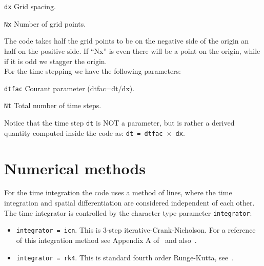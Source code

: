 \documentclass[12pt]{article}
\begin{document}
\begin{list}{}{
\setlength{\leftmargin}{25mm}
\setlength{\labelsep}{10mm}
\setlength{\labelwidth}{15mm}}

\item[\texttt{dx}] Grid spacing.

\item[\texttt{Nx}] Number of grid points.

\end{list}

The code takes half the grid points to be on the negative side of the
origin an half on the positive side.  If ``Nx'' is even there will be a
point on the origin, while if it is odd we stagger the origin. \\

For the time stepping we have the following parameters:

\begin{list}{}{
\setlength{\leftmargin}{25mm}
\setlength{\labelsep}{10mm}
\setlength{\labelwidth}{15mm}}

\item[\texttt{dtfac}] Courant parameter (dtfac=dt/dx).

\item[\texttt{Nt}] Total number of time steps.

\end{list}

Notice that the time step \texttt{dt} is NOT a parameter, but is
rather a derived quantity computed inside the code as: \texttt{dt =
dtfac $\times$ dx}.



\setcounter{equation}{0}
\section{Numerical methods}
\label{sec:numerics}

For the time integration the code uses a method of lines, where the
time integration and spatial differentiation are considered
independent of each other. \\

The time integrator is controlled by the character type parameter
\texttt{integrator}:

\begin{itemize}

\item \texttt{integrator = icn}. This is 3-step
iterative-Crank-Nicholson.  For a reference of this integration method
see Appendix A of~\cite{Alcubierre99d} and also~\cite{Teukolsky00}.

\item \texttt{integrator = rk4}. This is standard fourth order
Runge-Kutta, see~\cite{Press86}.

\end{itemize}
\end{document}
